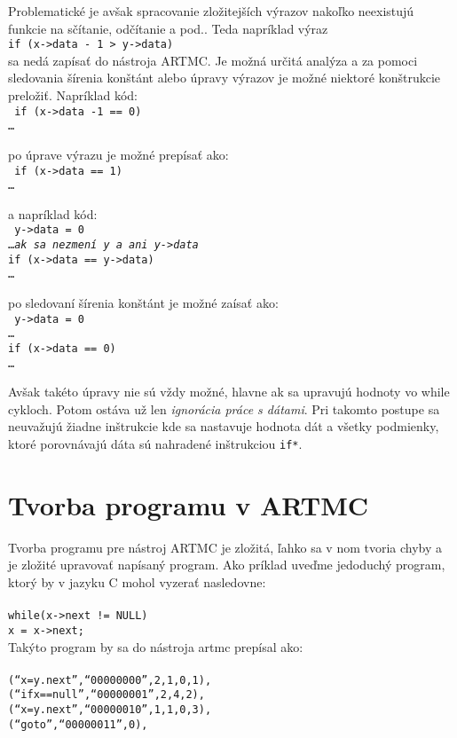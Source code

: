 Problematické je avšak spracovanie zložitejších výrazov nakoľko neexistujú funkcie na sčítanie, odčítanie a pod.. Teda napríklad výraz\\
\tab \texttt{if (x->data - 1 > y->data)}\\
sa nedá zapísať do nástroja ARTMC. Je možná určitá analýza a za pomoci sledovania šírenia konštánt alebo úpravy výrazov je možné niektoré konštrukcie preložiť. Napríklad kód:\\
\texttt{
if (x->data -1 == 0)\\
\tab \dots
}  

\noindent
po úprave výrazu je možné prepísať ako:\\
\texttt{
if (x->data == 1)\\
\tab \dots
}  

\noindent
a napríklad kód:\\
\texttt{
y->data = 0\\
\dots \textit{ak sa nezmení y a ani y->data}\\
if (x->data == y->data)\\
\tab \dots
}  

\noindent
po sledovaní šírenia konštánt je možné zaísať ako:\\
\texttt{
y->data = 0\\
\dots\\
if (x->data == 0)\\ 
\tab \dots
}  

Avšak takéto úpravy nie sú vždy možné, hlavne ak sa upravujú hodnoty vo while cykloch. Potom ostáva už len \textit{ignorácia práce s dátami}. Pri takomto postupe sa neuvažujú žiadne inštrukcie kde sa nastavuje hodnota dát a všetky podmienky, ktoré porovnávajú dáta sú nahradené inštrukciou \texttt{if*}.

\section{Tvorba programu v ARTMC}
Tvorba programu pre nástroj ARTMC je zložitá, ľahko sa v nom tvoria chyby a je zložité
upravovať napísaný program.
Ako príklad uveďme jedoduchý program, ktorý by v jazyku C mohol vyzerať nasledovne:\\
\noindent
\texttt{
\\
while(x->next != NULL)\\
\tab x = x->next;
\\
}
\noindent
Takýto program by sa do nástroja artmc prepísal ako:\\
\texttt{ 
\\
\tab (``x=y.next'',``00000000'',2,1,0,1),\\
\tab (``ifx==null'',``00000001'',2,4,2),\\
\tab (``x=y.next'',``00000010'',1,1,0,3),\\
\tab (``goto'',``00000011'',0),\\
}

